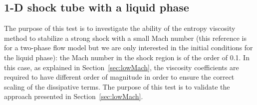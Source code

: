 \documentclass[preprint,10pt]{elsarticle}
\newcommand{\sct}[1]{Section~\ref{#1}}                   %
\newcommand{\tcr}[1]{\textcolor{red}{#1}}
\newcommand{\tcb}[1]{\textcolor{blue}{#1}}
\begin{document}
\subsection{1-D shock tube with a liquid phase} \label{sec:liquid_shock}
The purpose of this test is to investigate the ability of the entropy viscosity method to stabilize a strong 
shock with a small Mach number \cite{abgrall} (this reference is for a two-phase flow model but we are only 
interested in the initial conditions for the liquid phase): the Mach number in the shock region is of the 
order of 0.1. In this case, as explained in \sct{sec:lowMach}, the viscosity coefficients are required to 
have different order of magnitude in order to ensure the correct scaling of the dissipative terms. 
The purpose of this test is to validate the approach presented in \sct{sec:lowMach}. 
\end{document}
